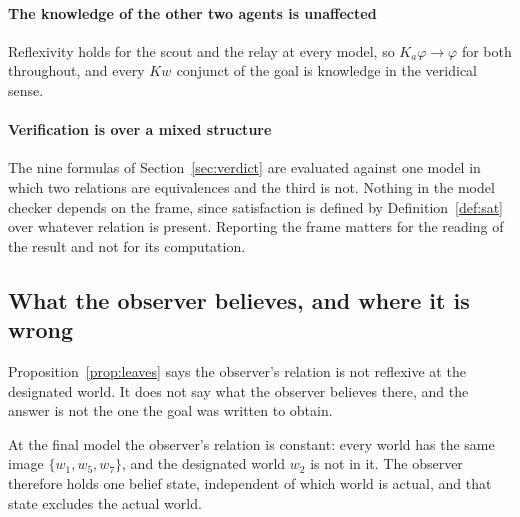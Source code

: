 \documentclass[11pt,a4paper]{article}
\theoremstyle{definition}
\newcommand{\Kop}[1]{K_{#1}}
\newcommand{\Kw}[1]{\mathit{Kw}_{#1}}
\begin{document}
\paragraph{The knowledge of the other two agents is unaffected} Reflexivity
holds for the scout and the relay at every model, so
$\Kop{a}\varphi \rightarrow \varphi$ for both throughout, and every $\Kw{}$
conjunct of the goal is knowledge in the veridical sense.

\paragraph{Verification is over a mixed structure} The nine formulas of
Section~\ref{sec:verdict} are evaluated against one model in which two
relations are equivalences and the third is not. Nothing in the model checker
depends on the frame, since satisfaction is defined by
Definition~\ref{def:sat} over whatever relation is present. Reporting the frame
matters for the reading of the result and not for its computation.

\subsection{What the observer believes, and where it is wrong}
\label{sec:belief}

Proposition~\ref{prop:leaves} says the observer's relation is not reflexive at
the designated world. It does not say what the observer believes there, and
the answer is not the one the goal was written to obtain.

At the final model the observer's relation is constant: every world has the
same image $\{w_1, w_5, w_7\}$, and the designated world $w_2$ is not in it.
The observer therefore holds one belief state, independent of which world is
actual, and that state excludes the actual world.
\end{document}
